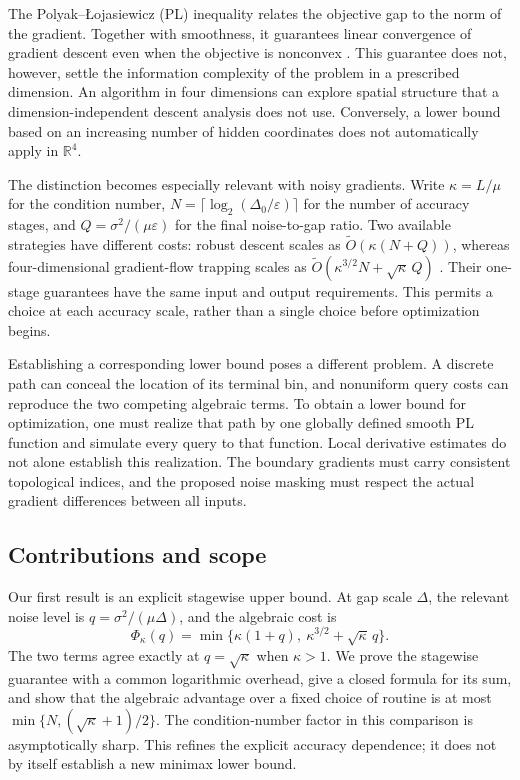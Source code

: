 \documentclass[11pt,a4paper]{article}
\newcommand{\R}{\mathbb R}
\newcommand{\eps}{\varepsilon}
\newcommand{\tO}{\widetilde O}
\theoremstyle{definition}
\theoremstyle{remark}
\begin{document}
The Polyak--\L{}ojasiewicz (PL) inequality relates the objective gap to
the norm of the gradient.  Together with smoothness, it guarantees
linear convergence of gradient descent even when the objective is
nonconvex \cite{karimi2016}.  This guarantee does not, however, settle
the information complexity of the problem in a prescribed dimension.
An algorithm in four dimensions can explore spatial structure that
a dimension-independent descent analysis does not use.  Conversely,
a lower bound based on an increasing number of hidden coordinates
does not automatically apply in $\R^4$.

The distinction becomes especially relevant with noisy gradients.
Write $\kappa=L/\mu$ for the condition number,
$N=\lceil\log_2(\Delta_0/\eps)\rceil$ for the number of accuracy stages,
and $Q=\sigma^2/(\mu\eps)$ for the final noise-to-gap ratio.
Two available strategies have different costs: robust descent scales
as $\tO(\kappa(N+Q))$, whereas four-dimensional gradient-flow trapping
scales as $\tO(\kappa^{3/2}N+\sqrt\kappa\,Q)$
\cite{ouwang2026}.  Their one-stage guarantees have the same input and
output requirements.  This permits a choice at each accuracy scale,
rather than a single choice before optimization begins.

Establishing a corresponding lower bound poses a different problem.
A discrete path can conceal the location of its terminal bin, and
nonuniform query costs can reproduce the two competing algebraic
terms.  To obtain a lower bound for optimization, one must realize
that path by one globally defined smooth PL function and simulate
every query to that function.  Local derivative estimates do not
alone establish this realization.  The boundary gradients must carry
consistent topological indices, and the proposed noise masking must
respect the actual gradient differences between all inputs.

\subsection{Contributions and scope}

Our first result is an explicit stagewise upper bound.  At gap scale
$\Delta$, the relevant noise level is $q=\sigma^2/(\mu\Delta)$, and the
algebraic cost is
\[
 \Phi_\kappa(q)
 =\min\{\kappa(1+q),\ \kappa^{3/2}+\sqrt\kappa\,q\}.
\]
The two terms agree exactly at $q=\sqrt\kappa$ when $\kappa>1$.
We prove the stagewise guarantee with a common logarithmic overhead,
give a closed formula for its sum, and show that the algebraic
advantage over a fixed choice of routine is at most
$\min\{N,(\sqrt\kappa+1)/2\}$.  The condition-number factor in this
comparison is asymptotically sharp.  This refines the explicit
accuracy dependence; it does not by itself establish a new minimax
lower bound.
\end{document}
